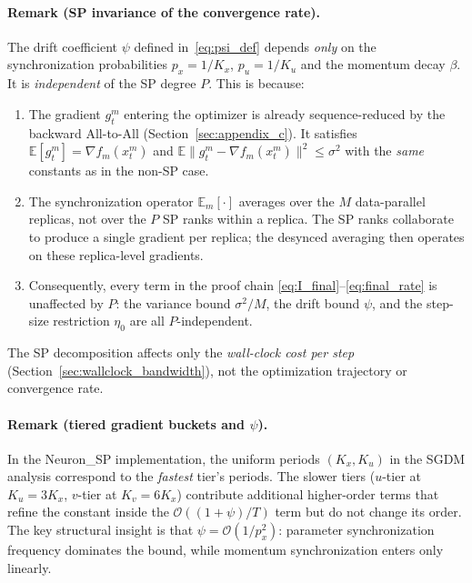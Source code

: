 \documentclass{article}
\begin{document}
\paragraph{Remark (SP invariance of the convergence rate).}
The drift coefficient $\psi$ defined in~\eqref{eq:psi_def} depends
\emph{only} on the synchronization probabilities $p_x = 1/K_x$,
$p_u = 1/K_u$ and the momentum decay $\beta$. It is
\emph{independent} of the SP degree $P$. This is because:
\begin{enumerate}
\item The gradient $g_t^m$ entering the optimizer is already
  sequence-reduced by the backward All-to-All (Section~\ref{sec:appendix_c}).
  It satisfies $\mathbb{E}[g_t^m] = \nabla f_m(x_t^m)$ and
  $\mathbb{E}\|g_t^m - \nabla f_m(x_t^m)\|^2 \leq \sigma^2$
  with the \emph{same} constants as in the non-SP case.
\item The synchronization operator $\mathbb{E}_m[\cdot]$ averages
  over the $M$ data-parallel replicas, not over the $P$ SP ranks
  within a replica. The SP ranks collaborate to produce a single
  gradient per replica; the desynced averaging then operates on
  these replica-level gradients.
\item Consequently, every term in the proof chain
  \eqref{eq:I_final}--\eqref{eq:final_rate}
  is unaffected by $P$: the variance bound $\sigma^2/M$, the
  drift bound $\psi$, and the step-size restriction $\eta_0$ are
  all $P$-independent.
\end{enumerate}
The SP decomposition affects only the \emph{wall-clock cost per step}
(Section~\ref{sec:wallclock_bandwidth}), not the optimization trajectory
or convergence rate.

\paragraph{Remark (tiered gradient buckets and $\psi$).}
In the Neuron\_SP implementation, the uniform periods $(K_x, K_u)$ in the
SGDM analysis correspond to the \emph{fastest} tier's periods. The slower
tiers ($u$-tier at $K_u = 3K_x$, $v$-tier at $K_v = 6K_x$) contribute
additional higher-order terms that refine the constant inside the
$\mathcal{O}((1+\psi)/T)$ term but do not change its order. The key
structural insight is that $\psi = \mathcal{O}(1/p_x^2)$: parameter
synchronization frequency dominates the bound, while momentum
synchronization enters only linearly.

\end{document}
